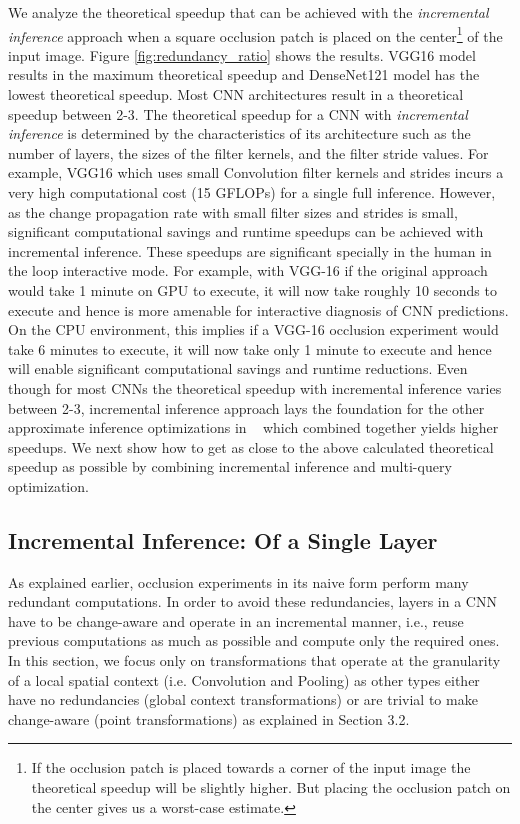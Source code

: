 We analyze the theoretical speedup that can be achieved with the \textit{incremental inference} approach when a square occlusion patch is placed on the center\footnote{If the occlusion patch is placed towards a corner of the input image the theoretical speedup will be slightly higher.
But placing the occlusion patch on the center gives us a worst-case estimate.} of the input image.
Figure \ref{fig:redundancy_ratio} shows the results.
VGG16 model results in the maximum theoretical speedup and DenseNet121 model has the lowest theoretical speedup.
Most CNN architectures result in a theoretical speedup between 2-3.
The theoretical speedup for a CNN with \textit{incremental inference} is determined by the characteristics of its architecture such as the number of layers, the sizes of the filter kernels, and the filter stride values.
For example, VGG16 which uses small Convolution filter kernels and strides incurs a very high computational cost (15 GFLOPs) for a single full inference.
However, as the change propagation rate with small filter sizes and strides is small, significant computational savings and runtime speedups can be achieved with incremental inference.
These speedups are significant specially in the human in the loop interactive mode.
For example, with VGG-16 if the original approach would take 1 minute on GPU to execute, it will now take roughly 10 seconds to execute and hence is more amenable for interactive diagnosis of CNN predictions.
On the CPU environment, this implies if a VGG-16 occlusion experiment would take 6 minutes to execute, it will now take only 1 minute to execute and hence will enable significant computational savings and runtime reductions.
Even though for most CNNs the theoretical speedup with incremental inference varies between 2-3, incremental inference approach lays the foundation for the other approximate inference optimizations in \system~ which combined together yields higher speedups.
We next show how to get as close to the above calculated theoretical speedup as possible by combining incremental inference and multi-query optimization.


\subsection{Incremental Inference: Of a Single Layer}\label{sec:inc_computation}
As explained earlier, occlusion experiments in its naive form perform many redundant computations.
In order to avoid these redundancies, layers in a CNN have to be change-aware and operate in an incremental manner, i.e., reuse previous computations as much as possible and compute only the required ones.
In this section, we focus only on transformations that operate at the granularity of a local spatial context (i.e. Convolution and Pooling) as other types either have no redundancies (global context transformations) or are trivial to make change-aware (point transformations) as explained in Section 3.2.

